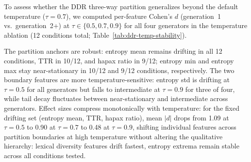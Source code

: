 To assess whether the DDR three-way partition generalizes beyond the default temperature ($\tau{=}0.7$), we computed per-feature Cohen's $d$ (generation~1 vs.\ generation~2+) at $\tau \in \{0.5, 0.7, 0.9\}$ for all four generators in the temperature ablation (12 conditions total; Table~\ref{tab:ddr-temp-stability}).

\begin{table}[ht]
\centering
\small
\caption{Mean $|d|$ (gen-1 vs.\ gen-2+) across 4 generators at each temperature. Partition labels: \textbf{D}rifting ($|d|>0.5$), \textbf{I}ntermediate ($0.1{<}|d|{<}0.5$), near-\textbf{S}tationary ($|d|{<}0.1$). Boldface marks features that shift from their $\tau{=}0.7$ partition.}
\label{tab:ddr-temp-stability}
\end{table}

The partition anchors are robust: entropy mean remains drifting in all 12 conditions, TTR in 10/12, and hapax ratio in 9/12; entropy min and entropy max stay near-stationary in 10/12 and 9/12 conditions, respectively.
The two boundary features are more temperature-sensitive: entropy std is drifting at $\tau{=}0.5$ for all generators but falls to intermediate at $\tau{=}0.9$ for three of four, while tail decay fluctuates between near-stationary and intermediate across generators.
Effect sizes compress monotonically with temperature: for the fixed drifting set (entropy mean, TTR, hapax ratio), mean $|d|$ drops from 1.09 at $\tau{=}0.5$ to 0.90 at $\tau{=}0.7$ to 0.48 at $\tau{=}0.9$, shifting individual features across partition boundaries at high temperature without altering the qualitative hierarchy: lexical diversity features drift fastest, entropy extrema remain stable across all conditions tested.
